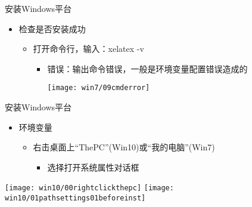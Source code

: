 \documentclass[fontset = none, t]{ctexbeamer}
\begin{document}
\begin{frame}{安装\tl}{Windows平台}
  \begin{spacing}{1.5}
    \begin{itemize}
    \item 检查\tl 是否安装成功
      \begin{itemize}
      \item 打开命令行，输入：xelatex -v
        \begin{itemize}
        \item 错误：输出\alert{命令错误}，一般是\alert{环境变量}配置错误造成的
          \begin{center}
            \texttt{[image: win7/09cmderror]}
          \end{center}
        \end{itemize}
      \end{itemize}
    \end{itemize}
  \end{spacing}         
\end{frame}

\begin{frame}{安装\tl}{Windows平台}
  \begin{spacing}{1.5}
    \begin{itemize}
    \item 环境变量
      \begin{itemize}
      \item 右击桌面上\enquote{ThePC}(Win10)或\enquote{我的电脑}(Win7)
        \begin{itemize}
        \item 选择打开系统属性对话框          
        \end{itemize}
      \end{itemize}
    \end{itemize}
    \begin{center}
      \texttt{[image: win10/00rightclickthepc]}
      \texttt{[image: win10/01pathsettings01beforeinst]}
    \end{center}
  \end{spacing}         
\end{frame}
\end{document}
